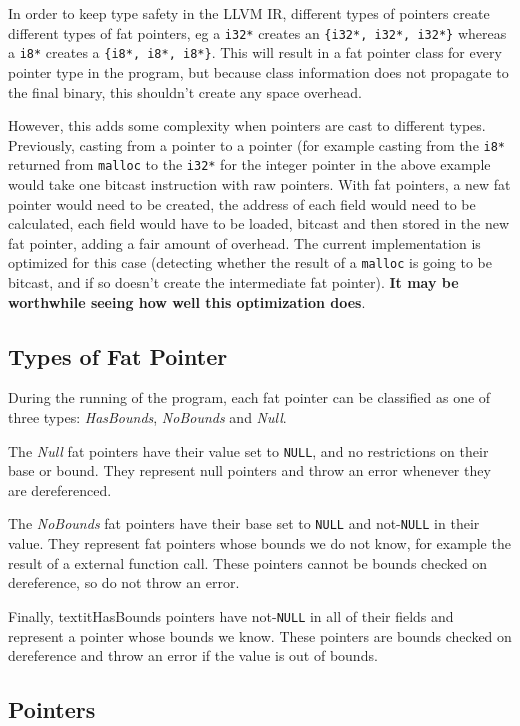 In order to keep type safety in the LLVM IR, different types of pointers create different types of fat pointers, eg a \verb!i32*! creates an \verb!{i32*, i32*, i32*}! whereas a \verb!i8*! creates a \verb!{i8*, i8*, i8*}!.
This will result in a fat pointer class for every pointer type in the program, but because class information does not propagate to the final binary, this shouldn't create any space overhead.

However, this adds some complexity when pointers are cast to different types.
Previously, casting from a pointer to a pointer (for example casting from the \verb!i8*! returned from \verb!malloc! to the \verb!i32*! for the integer pointer in the above example would take one bitcast instruction with raw pointers.
With fat pointers, a new fat pointer would need to be created, the address of each field would need to be calculated, each field would have to be loaded, bitcast and then stored in the new fat pointer, adding a fair amount of overhead.
The current implementation is optimized for this case (detecting whether the result of a \verb!malloc! is going to be bitcast, and if so doesn't create the intermediate fat pointer).
\textbf{It may be worthwhile seeing how well this optimization does}.

\subsection{Types of Fat Pointer}

During the running of the program, each fat pointer can be classified as one of three types: \textit{HasBounds}, \textit{NoBounds} and \textit{Null}.

The \textit{Null} fat pointers have their value set to \verb!NULL!, and no restrictions on their base or bound.
They represent null pointers and throw an error whenever they are dereferenced.

The \textit{NoBounds} fat pointers have their base set to \verb!NULL! and not-\verb!NULL! in their value.
They represent fat pointers whose bounds we do not know, for example the result of a external function call.
These pointers cannot be bounds checked on dereference, so do not throw an error.

Finally, textit{HasBounds} pointers have not-\verb!NULL! in all of their fields and represent a pointer whose bounds we know.
These pointers are bounds checked on dereference and throw an error if the value is out of bounds.

\subsection{Pointers}

